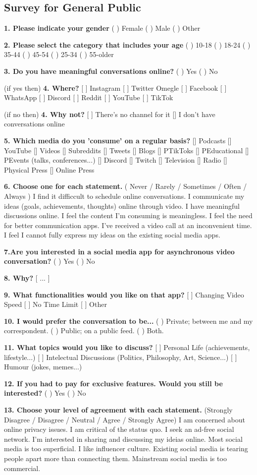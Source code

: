 \documentclass[12pt]{article}
\begin{document}
\subsection{Survey for General Public}\label{qgp}
\textbf{1. Please indicate your gender}
( ) Female ( ) Male ( ) Other

\textbf{2. Please select the category that includes your age}
( ) 10-18   ( ) 18-24   ( ) 35-44    ( ) 45-54 ( ) 25-34   ( )  55-older

\textbf{3. Do you have meaningful conversations online?}
( ) Yes   ( ) No

(if yes then) \textbf{4. Where?}
[ ] Instagram [ ]  Twitter Omegle  [ ]  Facebook [ ]  WhatsApp  [ ]  Discord  [ ] Reddit  [ ]  YouTube  [ ]  TikTok

(if no then) \textbf{4. Why not?}
[ ] There's no channel for it  [] I don't have conversations online 

\textbf{5. Which media do you 'consume' on a regular basis?}
[] Podcasts []  YouTube [] Videos [] Subreddits  []  Tweets
[] Blogs [] PTikToks [] PEducational [] PEvents (talks, conferences...) [] Discord
[]  Twitch [] Television []  Radio [] Physical Press [] Online Press

\textbf{6. Choose one for each statement. }( Never / Rarely / Sometimes / Often / Always )
I find it difficcult to schedule online conversations. 
I communicate my ideas (goals, achievements, thoughts) online through video.
I have meaningful discussions online.
I feel the content I'm consuming is meaningless.
I feel the need for better communication apps.
I've received a video call at an inconvenient time.
I feel I cannot fully express my ideas on the existing social media apps.

\textbf{7.Are you interested in a social media app for asynchronous video conversation?}
( ) Yes ( ) No

\textbf{8. Why?} [        ...        ]

\textbf{9. What functionalities would you like on that app?}
[ ] Changing Video Speed [ ] No Time Limit  [ ] Other

\textbf{10. I would prefer the conversation to be...}
( ) Private; between me and my correspondent.  ( ) Public; on a public feed. ( ) Both.

\textbf{11. What topics would you like to discuss?}
[ ] Personal Life (achievements, lifestyle...)   
[ ] Intelectual Discussions (Politics, Philosophy, Art, Science...)     [ ] Humour (jokes, memes...)

\textbf{12. If you had to pay for exclusive features. Would you still be interested?}
( ) Yes    ( ) No

\textbf{13. Choose your level of agreement with each statement.} (Strongly Disagree /
Disagree / Neutral / Agree / Strongly Agree)
I am concerned about online privacy issues.
I am critical of the status quo.
I seek an ad-free social network.
I'm interested in sharing and discussing my ideias online.
Most social media is too superficial. I like influencer culture.
Existing social media is tearing people apart more than connecting them.
Mainstream social media is too commercial.
\end{document}
